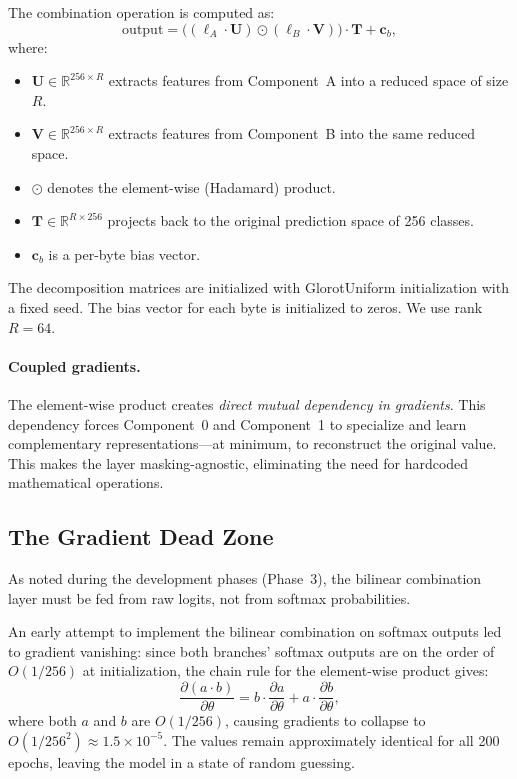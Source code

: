 \documentclass[runningheads]{llncs}
\begin{document}
The combination operation is computed as:
\begin{equation}\label{eq:bilinear_op}
  \text{output} = \bigl((\bm{\ell}_A \cdot \bm{U}) \odot (\bm{\ell}_B \cdot \bm{V})\bigr) \cdot \bm{T} + \bm{c}_b,
\end{equation}
where:
\begin{itemize}[leftmargin=*]
  \item $\bm{U} \in \mathbb{R}^{256 \times R}$ extracts features from Component~A into a reduced space of size $R$.
  \item $\bm{V} \in \mathbb{R}^{256 \times R}$ extracts features from Component~B into the same reduced space.
  \item $\odot$ denotes the element-wise (Hadamard) product.
  \item $\bm{T} \in \mathbb{R}^{R \times 256}$ projects back to the original prediction space of 256 classes.
  \item $\bm{c}_b$ is a per-byte bias vector.
\end{itemize}

The decomposition matrices are initialized with GlorotUniform initialization with a fixed seed.
The bias vector for each byte is initialized to zeros.
We use rank $R = 64$.

\paragraph{Coupled gradients.}
The element-wise product creates \emph{direct mutual dependency in gradients}.
This dependency forces Component~0 and Component~1 to specialize and learn complementary representations---at minimum, to reconstruct the original value.
This makes the layer masking-agnostic, eliminating the need for hardcoded mathematical operations.

\subsection{The Gradient Dead Zone}\label{sec:deadzone}

As noted during the development phases (Phase~3), the bilinear combination layer must be fed from raw logits, not from softmax probabilities.

An early attempt to implement the bilinear combination on softmax outputs led to gradient vanishing: since both branches' softmax outputs are on the order of $O(1/256)$ at initialization, the chain rule for the element-wise product gives:
\begin{equation}
  \frac{\partial(a \cdot b)}{\partial \theta} = b \cdot \frac{\partial a}{\partial \theta} + a \cdot \frac{\partial b}{\partial \theta},
\end{equation}
where both $a$ and $b$ are $O(1/256)$, causing gradients to collapse to $O(1/256^2) \approx 1.5 \times 10^{-5}$.
The values remain approximately identical for all 200 epochs, leaving the model in a state of random guessing.
\end{document}
